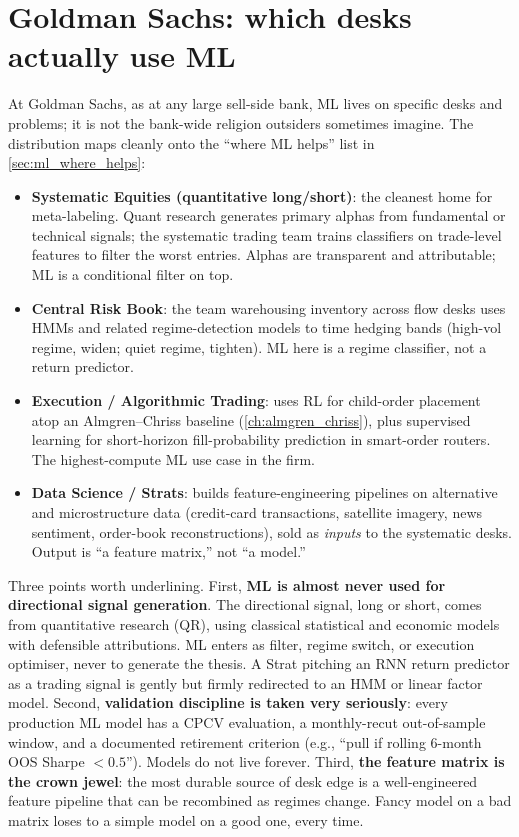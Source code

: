 \section{Goldman Sachs: which desks actually use ML}
\label{sec:ml_gs}

\begin{gsbox}
At Goldman Sachs, as at any large sell-side bank, ML lives on
specific desks and problems; it is not the bank-wide religion
outsiders sometimes imagine. The distribution maps cleanly onto
the ``where ML helps'' list in \cref{sec:ml_where_helps}:

\begin{itemize}
  \item \textbf{Systematic Equities (quantitative
  long/short)}: the cleanest home for meta-labeling.
  Quant research generates primary alphas from
  fundamental or technical signals; the systematic
  trading team trains classifiers on trade-level
  features to filter the worst entries. Alphas are
  transparent and attributable; ML is a conditional
  filter on top.
  \item \textbf{Central Risk Book}: the team
  warehousing inventory across flow desks uses HMMs and
  related regime-detection models to time hedging bands
  (high-vol regime, widen; quiet regime, tighten). ML
  here is a regime classifier, not a return predictor.
  \item \textbf{Execution / Algorithmic Trading}: uses
  RL for child-order placement atop an Almgren--Chriss
  baseline (\cref{ch:almgren_chriss}), plus supervised
  learning for short-horizon fill-probability prediction
  in smart-order routers. The highest-compute ML use
  case in the firm.
  \item \textbf{Data Science / Strats}: builds
  feature-engineering pipelines on alternative and
  microstructure data (credit-card transactions,
  satellite imagery, news sentiment, order-book
  reconstructions), sold as \emph{inputs} to the
  systematic desks. Output is ``a feature matrix,'' not
  ``a model.''
\end{itemize}

Three points worth underlining. First, \textbf{ML is almost
never used for directional signal generation}. The directional
signal, long or short, comes from quantitative research
(QR), using classical statistical and economic models with
defensible attributions. ML enters as filter, regime switch, or
execution optimiser, never to generate the thesis. A Strat
pitching an RNN return predictor as a trading signal is gently
but firmly redirected to an HMM or linear factor model. Second,
\textbf{validation discipline is taken very seriously}: every
production ML model has a CPCV evaluation, a monthly-recut
out-of-sample window, and a documented retirement criterion
(e.g., ``pull if rolling 6-month OOS Sharpe $< 0.5$''). Models
do not live forever. Third, \textbf{the feature matrix is the
crown jewel}: the most durable source of desk edge is a
well-engineered feature pipeline that can be recombined as
regimes change. Fancy model on a bad matrix loses to a simple
model on a good one, every time.
\end{gsbox}

